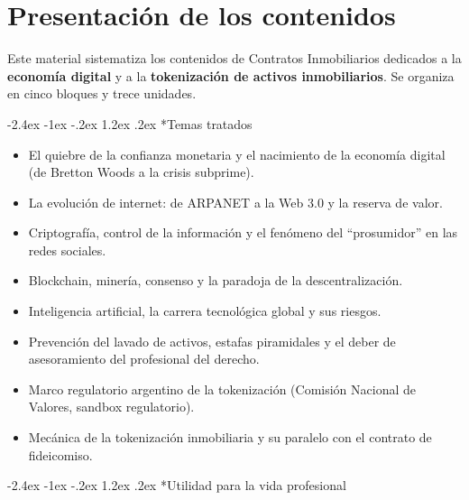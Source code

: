 \documentclass[12pt,oneside]{book}
\makeatletter
\newcommand{\materia}{Contratos Inmobiliarios}
\renewcommand\section{\@startsection{section}{1}{\z@}%
  {-2.4ex \@plus -1ex \@minus -.2ex}%
  {1.2ex \@plus .2ex}%
  {\normalfont\Large\bfseries\color{blue!50!black}}}
\makeatother
\begin{document}
\frontmatter
\tableofcontents
\mainmatter

\clearpage
{}
{}
\chapter*{Presentación de los contenidos}

Este material sistematiza los contenidos de \materia{} dedicados a la \textbf{economía digital} y a la \textbf{tokenización de activos inmobiliarios}. Se organiza en cinco bloques y trece unidades.

\section*{Temas tratados}

\begin{itemize}
    \item El quiebre de la confianza monetaria y el nacimiento de la economía digital (de Bretton Woods a la crisis subprime).
    \item La evolución de internet: de ARPANET a la Web 3.0 y la reserva de valor.
    \item Criptografía, control de la información y el fenómeno del ``prosumidor'' en las redes sociales.
    \item Blockchain, minería, consenso y la paradoja de la descentralización.
    \item Inteligencia artificial, la carrera tecnológica global y sus riesgos.
    \item Prevención del lavado de activos, estafas piramidales y el deber de asesoramiento del profesional del derecho.
    \item Marco regulatorio argentino de la tokenización (Comisión Nacional de Valores, sandbox regulatorio).
    \item Mecánica de la tokenización inmobiliaria y su paralelo con el contrato de fideicomiso.
\end{itemize}

\section*{Utilidad para la vida profesional}
\end{document}

